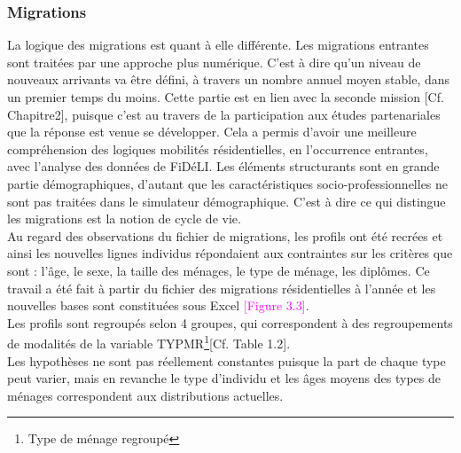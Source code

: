 \documentclass{bredele}
\begin{document}
\subsubsection{Migrations}
La logique des migrations est quant à elle différente.
Les migrations entrantes sont traitées par une approche plus numérique. C'est à dire qu'un niveau de nouveaux arrivants va être défini, à travers un nombre annuel moyen stable, dans un premier temps du moins. Cette partie est en lien avec la seconde mission [Cf. Chapitre2], puisque c'est au travers de la participation aux études partenariales que la réponse est venue se développer. Cela a permis d'avoir une meilleure compréhension des logiques mobilités résidentielles, en l'occurrence entrantes, avec l'analyse des données de FiDéLI. Les éléments structurants sont en grande partie démographiques, d'autant que les caractéristiques socio-professionnelles ne sont pas traitées dans le simulateur démographique. C'est à dire ce qui distingue les migrations est la notion de cycle de vie.\\
Au regard des observations du fichier de migrations, les profils ont été recrées et ainsi les nouvelles lignes individus répondaient aux contraintes sur les critères que sont : l'âge, le sexe, la taille des ménages, le type de ménage, les diplômes. Ce travail a été fait à partir du fichier des migrations résidentielles à l'année et les nouvelles bases sont constituées sous Excel \textcolor{magenta}{[Figure 3.3]}.\\
Les profils sont regroupés selon 4 groupes, qui correspondent à des regroupements de modalités de la variable TYPMR\footnote{Type de ménage regroupé}[Cf. Table 1.2].\\
Les hypothèses ne sont pas réellement constantes puisque la part de chaque type peut varier, mais en revanche le type d'individu et les âges moyens des types de ménages correspondent aux distributions actuelles.\\
\end{document}
